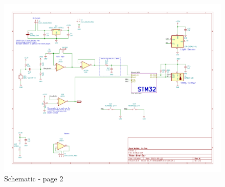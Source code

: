 \documentclass{article}
\begin{document}
\begin{figure}[H]
\centering
\includegraphics[scale=0.7, angle=90, page=2]{../birdEar/plot/birdEar.pdf}
\caption{Schematic - page 2}
\label{sch2}
\end{figure}
\end{document}
